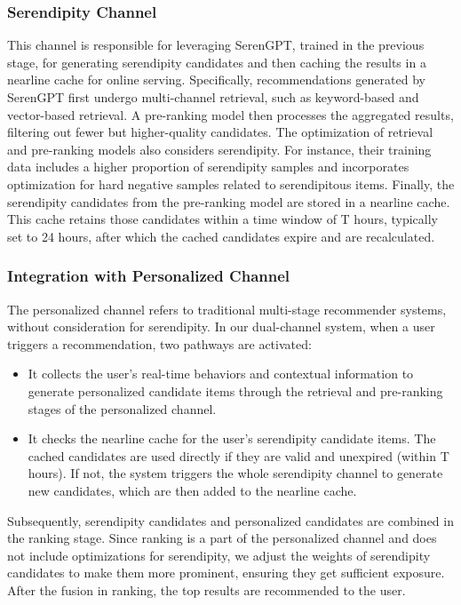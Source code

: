 \subsubsection{Serendipity Channel}
This channel is responsible for leveraging SerenGPT, trained in the previous stage, for generating serendipity candidates and then caching the results in a nearline cache for online serving. Specifically, recommendations generated by SerenGPT first undergo multi-channel retrieval, such as keyword-based and vector-based retrieval. A pre-ranking model then processes the aggregated results, filtering out fewer but higher-quality candidates. The optimization of retrieval and pre-ranking models also considers serendipity. For instance, their training data includes a higher proportion of serendipity samples and incorporates optimization for hard negative samples related to serendipitous items. Finally, the serendipity candidates from the pre-ranking model are stored in a nearline cache. This cache retains those candidates within a time window of T hours, typically set to 24 hours, after which the cached candidates expire and are recalculated.

\subsubsection{Integration with Personalized Channel}

The personalized channel refers to traditional multi-stage recommender systems, without consideration for serendipity. In our dual-channel system, when a user triggers a recommendation, two pathways are activated: 
\begin{itemize}
    \item It collects the user's real-time behaviors and contextual information to generate personalized candidate items through the retrieval and pre-ranking stages of the personalized channel.
    \item It checks the nearline cache for the user's serendipity candidate items. The cached candidates are used directly if they are valid and unexpired (within T hours). If not, the system triggers the whole serendipity channel to generate new candidates, which are then added to the nearline cache.
\end{itemize}
Subsequently, serendipity candidates and personalized candidates are combined in the ranking stage. Since ranking is a part of the personalized channel and does not include optimizations for serendipity, we adjust the weights of serendipity candidates to make them more prominent, ensuring they get sufficient exposure. After the fusion in ranking, the top results are recommended to the user.
